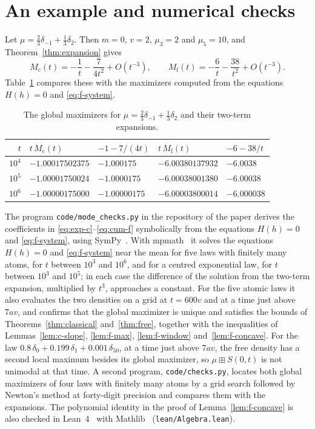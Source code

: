 \documentclass[11pt]{amsart}
\theoremstyle{definition}
\newcommand{\Mcl}{M_{\mathrm{c}}}
\newcommand{\Mfr}{M_{\mathrm{f}}}
\begin{document}
\section{An example and numerical checks}\label{sec:numerics}

Let $\mu=\frac23\delta_{-1}+\frac13\delta_{2}$. Then $m=0$, $v=2$, $\mu_3=2$ and $\mu_5=10$, and
Theorem~\ref{thm:expansion} gives
\[
\Mcl(t)=-\frac1t-\frac{7}{4t^2}+O(t^{-3}),\qquad \Mfr(t)=-\frac6t-\frac{38}{t^2}+O(t^{-3}).
\]
Table~\ref{tab:example} compares these with the maximizers computed from the equations $H(h)=0$
and \eqref{eq:f-system}.

\begin{table}[ht]
\centering
\begin{tabular}{rllll}
\toprule
$t$ & $t\,\Mcl(t)$ & $-1-7/(4t)$ & $t\,\Mfr(t)$ & $-6-38/t$\\
\midrule
$10^4$ & $-1.00017502375$ & $-1.000175$ & $-6.00380137932$ & $-6.0038$\\
$10^5$ & $-1.00001750024$ & $-1.0000175$ & $-6.00038001380$ & $-6.00038$\\
$10^6$ & $-1.00000175000$ & $-1.00000175$ & $-6.00003800014$ & $-6.000038$\\
\bottomrule
\end{tabular}
\caption{The global maximizers for $\mu=\frac23\delta_{-1}+\frac13\delta_2$ and their two-term
expansions.}\label{tab:example}
\end{table}

The program \texttt{code/mode\_checks.py} in the repository of the paper derives the coefficients
in \eqref{eq:exp-c}--\eqref{eq:cum-f} symbolically from the equations $H(h)=0$ and \eqref{eq:f-system}, using
SymPy~\cite{sympy}. With mpmath~\cite{mpmath} it solves the equations $H(h)=0$ and \eqref{eq:f-system} near the mean for five laws
with finitely many atoms, for $t$ between $10^3$ and $10^6$, and for a centred exponential law, for $t$ between
$10^3$ and $10^5$; in each case the difference of the solution from the
two-term expansion, multiplied by $t^3$, approaches a constant. For the five atomic laws it also evaluates the two
densities on a grid at $t=600v$ and at a time just above $7av$, and confirms that the global maximizer is unique and
satisfies the bounds of Theorems~\ref{thm:classical} and~\ref{thm:free}, together with the inequalities of
Lemmas~\ref{lem:c-slope}, \ref{lem:f-max}, \ref{lem:f-window} and~\ref{lem:f-concave}. For the law
$0.8\,\delta_0+0.199\,\delta_1+0.001\,\delta_{50}$, at a time just above $7av$, the free density has a second local
maximum besides its global maximizer, so $\mu\boxplus S(0,t)$ is not unimodal at that time. A second program,
\texttt{code/checks.py}, locates both global maximizers of four laws with finitely many atoms by a grid search
followed by Newton's method at forty-digit precision and compares them with the expansions. The polynomial identity
in the proof of Lemma~\ref{lem:f-concave} is also checked in Lean~4~\cite{Lean4} with Mathlib~\cite{mathlib}
(\texttt{lean/Algebra.lean}).
\end{document}
